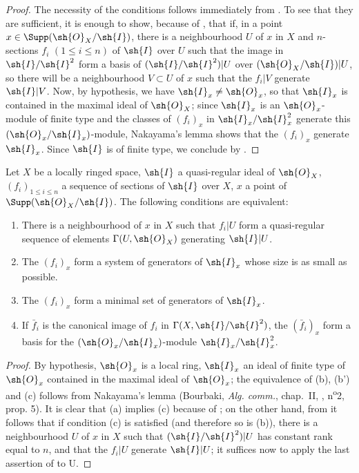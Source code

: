 \begin{proof}
The necessity of the conditions follows immediately from .
To see that they are sufficient, it is enough to show, because of , that if, in a point $x \in \Supp(\sh{O}_X/\sh{I})$, there is a neighbourhood $U$ of $x$ in $X$ and $n$-sections $f_i$ $(1 \leq i \leq n)$ of $\sh{I}$ over $U$ such that the image in $\sh{I}/\sh{I}^2$ form a basis of $(\sh{I}/\sh{I}^2)|U$ over $(\sh{O}_X/\sh{I})|U$, so there will be a neighbourhood $V \subset U$ of $x$ such that the $f_i|V$ generate $\sh{I}|V$.
Now, by hypothesis, we have $\sh{I}_x \neq \sh{O}_x$, so that $\sh{I}_x$ is contained in the maximal ideal of $\sh{O}_X$; 
since $\sh{I}_x$ is an $\sh{O}_x$-module of finite type and the classes of $(f_i)_x$ in $\sh{I}_x/\sh{I}_x^2$ generate this $(\sh{O}_x/\sh{I}_x)$-module, Nakayama's lemma shows that the $(f_i)_x$ generate $\sh{I}_x$.
Since $\sh{I}$ is of finite type, we conclude by .
\end{proof} 

\begin{corollary}[16.9.5]
\label{IV.16.9.5}
Let $X$ be a locally ringed space, $\sh{I}$ a quasi-regular ideal of $\sh{O}_X$, $(f_i)_{1 \leq i \leq n}$ a sequence of sections of $\sh{I}$ over $X$, $x$ a point of $\Supp(\sh{O}_X/\sh{I})$. 
The following conditions are equivalent:
\begin{enumerate}
  \item[(a)] There is a neighbourhood of $x$ in $X$ such that $f_i|U$ form a quasi-regular sequence of elements $\Gamma(U, \sh{O}_X)$ generating $\sh{I}|U$.
  \item[(b)] The $(f_i)_x$ form a system of generators of $\sh{I}_x$ whose size is as small as possible.
  \item[(b')] The $(f_i)_x$ form a minimal set of generators of $\sh{I}_x$.
  \item[(c)] If $\bar f_i$ is the canonical image of $f_i$ in $\Gamma(X, \sh{I}/\sh{I}^2)$, the $(\bar f_i)_x$ form a basis for the $(\sh{O}_x/\sh{I}_x)$-module $\sh{I}_x/\sh{I}_x^2$.
\end{enumerate}
\end{corollary}

\begin{proof}
By hypothesis, $\sh{O}_x$ is a local ring, $\sh{I}_x$ an ideal of finite type of $\sh{O}_x$ contained in the maximal ideal of $\sh{O}_x$;
the equivalence of (b), (b') and (c) follows from Nakayama's lemma (Bourbaki, \emph{Alg. comm.}, chap.~II, , n\textsuperscript{o}2, prop. 5).
It is clear that (a) implies (c) because of ;
on the other hand, from  it follows that if condition (c) is satisfied (and therefore so is (b)), there is a neighbourhood $U$ of $x$ in $X$ such that $(\sh{I}/\sh{I}^2)|U$ has constant rank equal to $n$, and that the $f_i|U$ generate $\sh{I}|U$;
it suffices now to apply the last assertion of  to U.
\end{proof}

